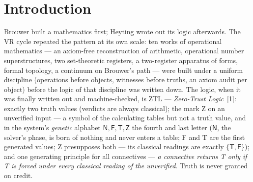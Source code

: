 \documentclass[11pt]{article}
\theoremstyle{remark}
\newcommand{\vT}{\textsf{T}}
\newcommand{\vF}{\textsf{F}}
\newcommand{\vZ}{\textsf{Z}}
\begin{document}
\begin{abstract}
\emph{redeemed} by the stage court: a law of logic, not of data.
(c)~\emph{The survival ledger}: a proof survives the move onto ZTL iff it
stands below the classical floor --- ZTL's fallen laws are laws of free
truth, their Lean fingerprint is \texttt{Classical.choice}, and a
constructive proof from earned premises is a chain of ZTL-alive rules. The
cycle's four-tier axiom ledger was therefore the ZTL-survival audit all
along; sweeping 405 live-audited objects plus flagship anchors shows that
everything VR calls operational moves, and what stays is exactly what the
cycle had already flagged as classical by design, by substrate, or by
borrowed plumbing. No operational theorem died in the move.
\\[3pt]
\emph{Keywords:} zero-trust logic, three-valued logic, witnessed
bisimulation, operational set theory, choice sequences, supervaluation,
Kripke persistence, intuitionism, constructive mathematics, axiom audit,
Lean~4, machine-checked proofs.
\end{abstract}

\section{Introduction}

Brouwer built a mathematics first; Heyting wrote out its logic afterwards.
The VR cycle repeated the pattern at its own scale: ten works of operational
mathematics --- an axiom-free reconstruction of arithmetic, operational
number superstructures, two set-theoretic registers, a two-register
apparatus of forms, formal topology, a continuum on Brouwer's path --- were
built under a uniform discipline (operations before objects, witnesses
before truths, an axiom audit per object) before the logic of that
discipline was written down. The logic, when it was finally written out and
machine-checked, is ZTL --- \emph{Zero-Trust Logic}~[1]: exactly two
truth values (verdicts are always classical); the mark \vZ{} on an
unverified input --- a symbol of the calculating tables but not a truth
value, and in the system's \emph{genetic} alphabet
$\mathsf{N},\vF,\vT,\vZ$ the fourth and last letter ($\mathsf{N}$, the
solver's phase, is born of nothing and never enters a table; \vF{} and
\vT{} are the first generated values; \vZ{} presupposes both --- its
classical readings are exactly $\{\vT,\vF\}$); and one
generating principle for all connectives --- \emph{a connective returns
\vT{} only if \vT{} is forced under every classical reading of the
unverified}. Truth is never granted on credit.
\end{document}
